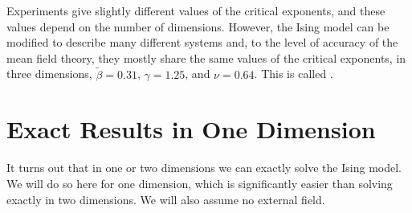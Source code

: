 \documentclass[fleqn]{NotesClass}
\begin{document}
    Experiments give slightly different values of the critical exponents, and these values depend on the number of dimensions.
    However, the Ising model can be modified to describe many different systems and, to the level of accuracy of the mean field theory, they mostly share the same values of the critical exponents, in three dimensions, \(\tilde{\beta} = 0.31\), \(\gamma = 1.25\), and \(\nu = 0.64\).
    This is called .
    
    \section{Exact Results in One Dimension}
    It turns out that in one or two dimensions we can exactly solve the Ising model.
    We will do so here for one dimension, which is significantly easier than solving exactly in two dimensions.
    We will also assume no external field.
    
\end{document}
